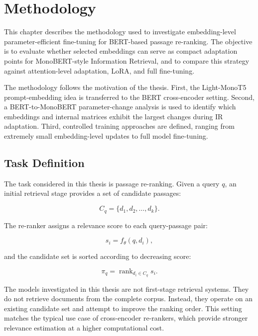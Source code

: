 \chapter{Methodology}
\label{ch:methodology}

This chapter describes the methodology used to investigate embedding-level parameter-efficient fine-tuning for BERT-based passage re-ranking. The objective is to evaluate whether selected embeddings can serve as compact adaptation points for MonoBERT-style Information Retrieval, and to compare this strategy against attention-level adaptation, LoRA, and full fine-tuning.

The methodology follows the motivation of the thesis. First, the Light-MonoT5 prompt-embedding idea is transferred to the BERT cross-encoder setting. Second, a BERT-to-MonoBERT parameter-change analysis is used to identify which embeddings and internal matrices exhibit the largest changes during IR adaptation. Third, controlled training approaches are defined, ranging from extremely small embedding-level updates to full model fine-tuning.

\section{Task Definition}
\label{sec:methodology_task}

The task considered in this thesis is passage re-ranking. Given a query $q$, an initial retrieval stage provides a set of candidate passages:

\begin{equation}
    C_q = \{d_1,d_2,\ldots,d_k\}.
\end{equation}

The re-ranker assigns a relevance score to each query-passage pair:

\begin{equation}
    s_i = f_\theta(q,d_i),
\end{equation}

and the candidate set is sorted according to decreasing score:

\begin{equation}
    \pi_q = \operatorname{rank}_{d_i \in C_q} s_i.
\end{equation}

The models investigated in this thesis are not first-stage retrieval systems. They do not retrieve documents from the complete corpus. Instead, they operate on an existing candidate set and attempt to improve the ranking order. This setting matches the typical use case of cross-encoder re-rankers, which provide stronger relevance estimation at a higher computational cost.

